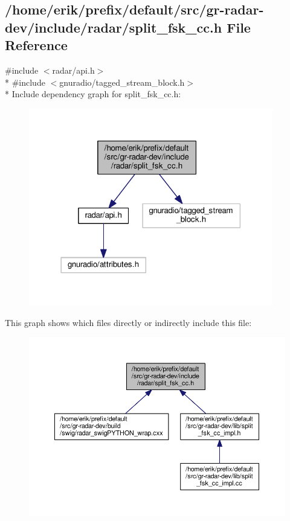 \subsection{/home/erik/prefix/default/src/gr-\/radar-\/dev/include/radar/split\+\_\+fsk\+\_\+cc.h File Reference}
\label{split__fsk__cc_8h}
{\ttfamily \#include $<$radar/api.\+h$>$}\\*
{\ttfamily \#include $<$gnuradio/tagged\+\_\+stream\+\_\+block.\+h$>$}\\*
Include dependency graph for split\+\_\+fsk\+\_\+cc.\+h\+:
\nopagebreak
\begin{figure}[H]
\begin{center}
\leavevmode
\includegraphics[width=302pt]{dd/d1c/split__fsk__cc_8h__incl}
\end{center}
\end{figure}
This graph shows which files directly or indirectly include this file\+:
\nopagebreak
\begin{figure}[H]
\begin{center}
\leavevmode
\includegraphics[width=350pt]{d1/d85/split__fsk__cc_8h__dep__incl}
\end{center}
\end{figure}
